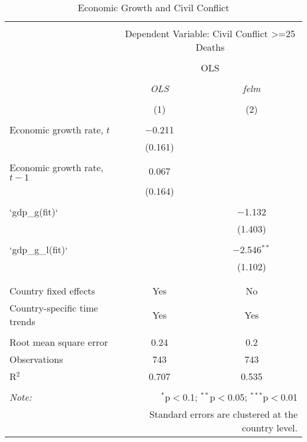 
\begin{table}[!htbp] \centering 
  \caption{Economic Growth and Civil Conflict} 
  \label{} 
\begin{tabular}{@{\extracolsep{5pt}}lcc} 
\\[-1.8ex]\hline 
\hline \\[-1.8ex] 
 & \multicolumn{2}{c}{Dependent Variable: Civil Conflict >=25 Deaths} \\ 
\cline{2-3} 
\\[-1.8ex] & \multicolumn{2}{c}{OLS} \\ 
\\[-1.8ex] & \textit{OLS} & \textit{felm} \\ 
\\[-1.8ex] & (1) & (2)\\ 
\hline \\[-1.8ex] 
 Economic growth rate, $t$ & $-$0.211 &  \\ 
  & (0.161) &  \\ 
  & & \\ 
 Economic growth rate, $t-1$ & 0.067 &  \\ 
  & (0.164) &  \\ 
  & & \\ 
 `gdp\_g(fit)` &  & $-$1.132 \\ 
  &  & (1.403) \\ 
  & & \\ 
 `gdp\_g\_l(fit)` &  & $-$2.546$^{**}$ \\ 
  &  & (1.102) \\ 
  & & \\ 
\hline \\[-1.8ex] 
Country fixed effects & Yes & No \\ 
Country-specific time trends & Yes & Yes \\ 
\hline \\[-1.8ex] 
Root mean square error & 0.24 & 0.2 \\ 
Observations & 743 & 743 \\ 
R$^{2}$ & 0.707 & 0.535 \\ 
\hline 
\hline \\[-1.8ex] 
\textit{Note:}  & \multicolumn{2}{r}{$^{*}$p$<$0.1; $^{**}$p$<$0.05; $^{***}$p$<$0.01} \\ 
 & \multicolumn{2}{r}{Standard errors are clustered at the country level.} \\ 
\end{tabular} 
\end{table} 
